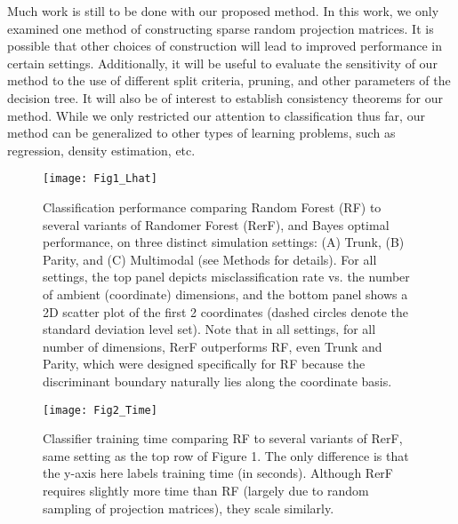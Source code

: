 \documentclass{article} %
\begin{document}
Much work is still to be done with our proposed method. In this work, we only examined one method of constructing sparse random projection matrices. It is possible that other choices of construction will lead to improved performance in certain settings. Additionally, it will be useful to evaluate the sensitivity of our method to the use of different split criteria, pruning, and other parameters of the decision tree. It will also be of interest to establish consistency theorems for our method. While we only restricted our attention to classification thus far, our method can be generalized to other types of learning problems, such as regression, density estimation, etc.

\begin{figure}[h]
\begin{center}
\texttt{[image: Fig1\_Lhat]}
\end{center}
\caption{Classification performance comparing Random Forest (RF) to several variants of Randomer Forest (RerF), and Bayes optimal performance, on three distinct simulation settings: (A) Trunk, (B) Parity, and (C) Multimodal (see Methods for details).  For all settings, the top panel depicts misclassification rate vs. the number of ambient (coordinate) dimensions, and the bottom panel shows a 2D scatter plot of the first 2 coordinates (dashed circles denote the standard deviation level set).  Note that in all settings, for all number of dimensions, RerF outperforms RF, even Trunk and Parity, which were designed specifically for RF because the discriminant boundary naturally lies along the coordinate basis.}
\end{figure}

\begin{figure}[h]
\begin{center}
\texttt{[image: Fig2\_Time]}
\end{center}
\caption{Classifier training time comparing RF to several variants of RerF, same setting as the top row of Figure 1. The only difference is that the y-axis here labels training time (in seconds). Although RerF requires slightly more time than RF (largely due to random sampling of projection matrices), they scale similarly.}
\end{figure}
\end{document}

